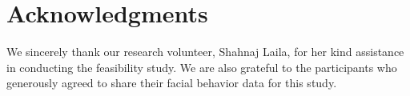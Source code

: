 \documentclass[acmsmall,screen]{acmart}
\begin{document}




\maketitle





% 


%


\section{Acknowledgments}
We sincerely thank our research volunteer, Shahnaj Laila, for her kind assistance in conducting the feasibility study. We are also grateful to the
participants who generously agreed to share their facial behavior data for
this study.




 
\end{document}
